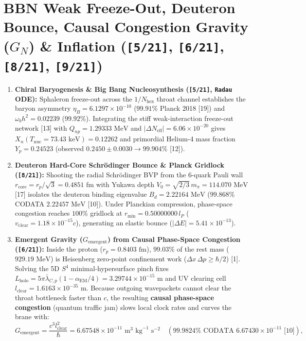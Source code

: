 \documentclass[10pt,a4paper]{article}
\begin{document}
\section{BBN Weak Freeze-Out, Deuteron Bounce, Causal Congestion Gravity ($G_N$) \& Inflation (\texttt{[5/21]}, \texttt{[6/21]}, \texttt{[8/21]}, \texttt{[9/21]})}
\begin{enumerate}
\item \textbf{Chiral Baryogenesis \& Big Bang Nucleosynthesis (\texttt{[5/21]}, \texttt{Radau} ODE):} Sphaleron freeze-out across the $1/N_{\text{hex}}$ throat channel establishes the baryon asymmetry $\eta_B = 6.1297 \times 10^{-10}$ ($99.91\%$ Planck 2018 [19]) and $\omega_b h^2 = 0.02239$ ($99.92\%$). Integrating the stiff weak-interaction freeze-out network [13] with $Q_{np} = 1.29333\text{ MeV}$ and $|\Delta N_{\text{eff}}| = 6.06 \times 10^{-20}$ gives $X_n(T_{\text{nuc}} = 73.43\text{ keV}) = 0.12262$ and primordial Helium-4 mass fraction $Y_p = 0.24523$ (observed $0.2450 \pm 0.0030 \to \mathbf{99.904\%}$ [12]).
\item \textbf{Deuteron Hard-Core Schrödinger Bounce \& Planck Gridlock (\texttt{[8/21]}):} Shooting the radial Schrödinger BVP from the 6-quark Pauli wall $r_{\text{core}} = r_p/\sqrt{3} = 0.4851\text{ fm}$ with Yukawa depth $V_0 = \sqrt{2/3}\,m_\pi = 114.070\text{ MeV}$ [17] isolates the deuteron binding eigenvalue $B_d = 2.22164\text{ MeV}$ ($99.868\%$ CODATA $2.22457\text{ MeV}$ [10]). Under Planckian compression, phase-space congestion reaches $100\%$ gridlock at $r_{\min} = 0.50000000\,l_P$ ($v_{\text{clear}} = 1.18 \times 10^{-15}c$), generating an elastic bounce ($|\Delta E| = 5.41 \times 10^{-13}$).
\item \textbf{Emergent Gravity ($G_{\text{emergent}}$) from Causal Phase-Space Congestion (\texttt{[6/21]}):} Inside the proton ($r_p = 0.8403\text{ fm}$), $99.03\%$ of the rest mass ($929.19\text{ MeV}$) is Heisenberg zero-point confinement work ($\Delta x\,\Delta p \ge \hbar/2$) [1]. Solving the 5D $S^4$ minimal-hypersurface pinch fixes $L_{\text{holo}} = 5\pi\bar{\lambda}_{C,p}(1 - \alpha_{\text{EM}}/4) = 3.29744 \times 10^{-15}\text{ m}$ and UV clearing cell $l_{\text{clear}} = 1.6163 \times 10^{-35}\text{ m}$. Because outgoing wavepackets cannot clear the throat bottleneck faster than $c$, the resulting \textbf{causal phase-space congestion} (quantum traffic jam) slows local clock rates and curves the brane with:
$$G_{\text{emergent}} = \frac{c^3 l_{\text{clear}}^2}{\hbar} = 6.67548 \times 10^{-11}\text{ m}^3\text{ kg}^{-1}\text{ s}^{-2} \quad (\mathbf{99.9824\%}\text{ CODATA } 6.67430 \times 10^{-11}\text{ [10]}),$$

\end{enumerate}
\end{document}

